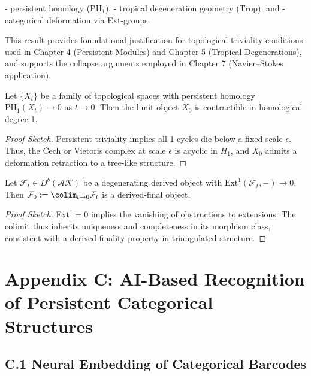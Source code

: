\documentclass[11pt]{article}
\begin{document}
- persistent homology ($\mathrm{PH}_1$),
- tropical degeneration geometry ($\mathrm{Trop}$), and
- categorical deformation via Ext-groups.

This result provides foundational justification for topological triviality conditions  
used in Chapter 4 (Persistent Modules) and Chapter 5 (Tropical Degenerations),  
and supports the collapse arguments employed in Chapter 7 (Navier–Stokes application).

\begin{lemma}
Let $\{X_t\}$ be a family of topological spaces with persistent homology $\mathrm{PH}_1(X_t) \to 0$ as $t \to 0$.  
Then the limit object $X_0$ is contractible in homological degree 1.
\end{lemma}

\begin{proof}[Proof Sketch]
Persistent triviality implies all 1-cycles die below a fixed scale $\epsilon$.  
Thus, the \v{C}ech or Vietoris complex at scale $\epsilon$ is acyclic in $H_1$, and $X_0$ admits a deformation retraction to a tree-like structure.
\end{proof}

\begin{lemma}
Let $\mathcal{F}_t \in D^b(\mathcal{AK})$ be a degenerating derived object with $\mathrm{Ext}^1(\mathcal{F}_t, -) \to 0$.  
Then $\mathcal{F}_0 := \colim_{t \to 0} \mathcal{F}_t$ is a derived-final object.
\end{lemma}

\begin{proof}[Proof Sketch]
Ext$^1 = 0$ implies the vanishing of obstructions to extensions.  
The colimit thus inherits uniqueness and completeness in its morphism class, consistent with a derived finality property in triangulated structure.
\end{proof}


\section*{Appendix C: AI-Based Recognition of Persistent Categorical Structures}

\subsection*{C.1 Neural Embedding of Categorical Barcodes}
\end{document}
